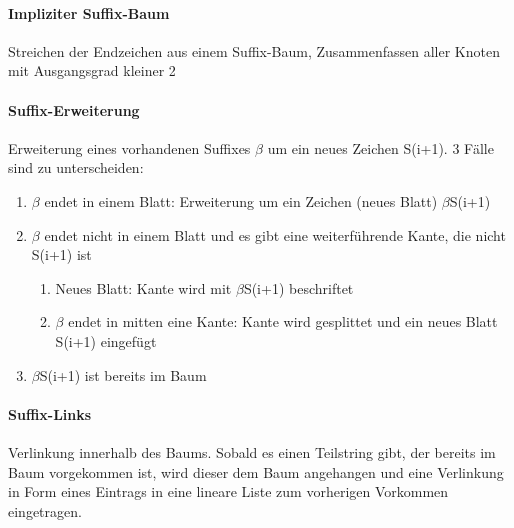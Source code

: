 \documentclass{article}
\begin{document}
\paragraph{Impliziter Suffix-Baum} Streichen der Endzeichen aus einem Suffix-Baum, Zusammenfassen aller Knoten mit Ausgangsgrad kleiner 2
\paragraph{Suffix-Erweiterung} Erweiterung eines vorhandenen Suffixes $\beta$ um ein neues Zeichen S(i+1). 3 Fälle sind zu unterscheiden:
\begin{enumerate}
\item $\beta$ endet in einem Blatt: Erweiterung um ein Zeichen (neues Blatt) $\beta$S(i+1)
\item $\beta$ endet nicht in einem Blatt und es gibt eine weiterführende Kante, die nicht S(i+1) ist
\begin{enumerate}
\item Neues Blatt: Kante wird mit $\beta$S(i+1) beschriftet
\item $\beta$ endet in mitten eine Kante: Kante wird gesplittet und ein neues Blatt S(i+1) eingefügt
\end{enumerate}
\item $\beta$S(i+1) ist bereits im Baum
\end{enumerate}

\paragraph{Suffix-Links} Verlinkung innerhalb des Baums. Sobald es einen Teilstring gibt, der bereits im Baum vorgekommen ist, wird dieser dem Baum angehangen und eine Verlinkung in Form eines Eintrags in eine lineare Liste zum vorherigen Vorkommen eingetragen.
\end{document}
